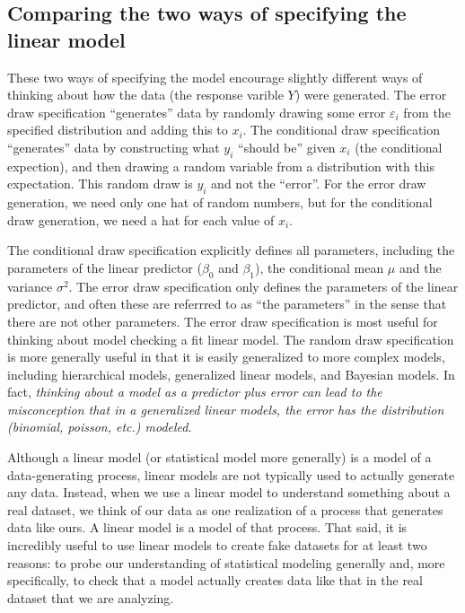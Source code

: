 \documentclass[]{book}
\begin{document}
\subsection{Comparing the two ways of specifying the linear
model}\label{comparing-the-two-ways-of-specifying-the-linear-model}

These two ways of specifying the model encourage slightly different ways
of thinking about how the data (the response varible \(Y\)) were
generated. The error draw specification ``generates'' data by randomly
drawing some error \(\varepsilon_i\) from the specified distribution and
adding this to \(x_i\). The conditional draw specification ``generates''
data by constructing what \(y_i\) ``should be'' given \(x_i\) (the
conditional expection), and then drawing a random variable from a
distribution with this expectation. This random draw is \(y_i\) and not
the ``error''. For the error draw generation, we need only one hat of
random numbers, but for the conditional draw generation, we need a hat
for each value of \(x_i\).

The conditional draw specification explicitly defines all parameters,
including the parameters of the linear predictor (\(\beta_0\) and
\(\beta_1\)), the conditional mean \(\mu\) and the variance
\(\sigma^2\). The error draw specification only defines the parameters
of the linear predictor, and often these are referrred to as ``the
parameters'' in the sense that there are not other parameters. The error
draw specification is most useful for thinking about model checking a
fit linear model. The random draw specification is more generally useful
in that it is easily generalized to more complex models, including
hierarchical models, generalized linear models, and Bayesian models. In
fact, \emph{thinking about a model as a predictor plus error can lead to
the misconception that in a generalized linear models, the error has the
distribution (binomial, poisson, etc.) modeled}.

Although a linear model (or statistical model more generally) is a model
of a data-generating process, linear models are not typically used to
actually generate any data. Instead, when we use a linear model to
understand something about a real dataset, we think of our data as one
realization of a process that generates data like ours. A linear model
is a model of that process. That said, it is incredibly useful to use
linear models to create fake datasets for at least two reasons: to probe
our understanding of statistical modeling generally and, more
specifically, to check that a model actually creates data like that in
the real dataset that we are analyzing.
\end{document}
